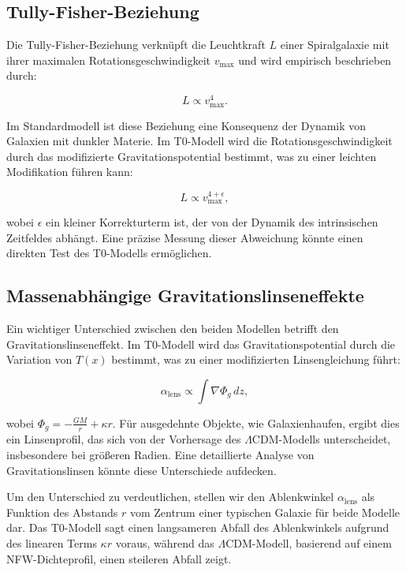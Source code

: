 \documentclass[a4paper,12pt]{article}
\newcommand{\Tfield}{T(x)}
\begin{document}
	\subsection{Tully-Fisher-Beziehung}
	
	Die Tully-Fisher-Beziehung verknüpft die Leuchtkraft \( L \) einer Spiralgalaxie mit ihrer maximalen Rotationsgeschwindigkeit \( v_{\text{max}} \) und wird empirisch beschrieben durch:
	
	\begin{equation}
		L \propto v_{\text{max}}^4.
	\end{equation}
	
	Im Standardmodell ist diese Beziehung eine Konsequenz der Dynamik von Galaxien mit dunkler Materie. Im T0-Modell wird die Rotationsgeschwindigkeit durch das modifizierte Gravitationspotential bestimmt, was zu einer leichten Modifikation führen kann:
	
	\begin{equation}
		L \propto v_{\text{max}}^{4 + \epsilon},
	\end{equation}
	
	wobei \( \epsilon \) ein kleiner Korrekturterm ist, der von der Dynamik des intrinsischen Zeitfeldes abhängt. Eine präzise Messung dieser Abweichung könnte einen direkten Test des T0-Modells ermöglichen.
	
	\subsection{Massenabhängige Gravitationslinseneffekte}
	
	Ein wichtiger Unterschied zwischen den beiden Modellen betrifft den Gravitationslinseneffekt. Im T0-Modell wird das Gravitationspotential durch die Variation von \( \Tfield \) bestimmt, was zu einer modifizierten Linsengleichung führt:
	
	\begin{equation}
		\alpha_{\text{lens}} \propto \int \nabla \Phi_g \, dz,
	\end{equation}
	
	wobei \( \Phi_g = -\frac{G M}{r} + \kappa r \). Für ausgedehnte Objekte, wie Galaxienhaufen, ergibt dies ein Linsenprofil, das sich von der Vorhersage des \( \Lambda \)CDM-Modells unterscheidet, insbesondere bei größeren Radien. Eine detaillierte Analyse von Gravitationslinsen könnte diese Unterschiede aufdecken.
	
	Um den Unterschied zu verdeutlichen, stellen wir den Ablenkwinkel \( \alpha_{\text{lens}} \) als Funktion des Abstands \( r \) vom Zentrum einer typischen Galaxie für beide Modelle dar. Das T0-Modell sagt einen langsameren Abfall des Ablenkwinkels aufgrund des linearen Terms \( \kappa r \) voraus, während das \( \Lambda \)CDM-Modell, basierend auf einem NFW-Dichteprofil, einen steileren Abfall zeigt.
	
\end{document}
